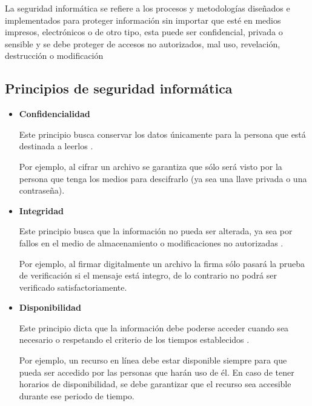 La seguridad inform\'{a}tica se refiere a los procesos y metodolog\'{i}as dise\~{n}ados e implementados para proteger informaci\'{o}n sin importar que est\'{e} en medios impresos, electr\'{o}nicos o de otro tipo, esta puede ser confidencial, privada o sensible y se debe proteger de accesos no autorizados, mal uso, revelaci\'{o}n, destrucci\'{o}n o modificaci\'{o}n \cite{_sans:_????}

  \subsection {Principios de seguridad inform\'{a}tica}

\begin{itemize}

  \item \textbf{Confidencialidad}

Este principio busca conservar los datos \'{u}nicamente para la persona que est\'{a} destinada a leerlos \cite{_nist_????}\cite{_information_????}.

Por ejemplo, al cifrar un archivo se garantiza que s\'{o}lo ser\'{a} visto por la persona que tenga los medios para descifrarlo (ya sea una llave privada o una contrase\~{n}a).

  \item \textbf{Integridad}

Este principio busca que la informaci\'{o}n no pueda ser alterada, ya sea por fallos en el medio de almacenamiento o modificaciones no autorizadas \cite{_nist_????}\cite{_information_????}.

Por ejemplo, al firmar digitalmente un archivo la firma s\'{o}lo pasar\'{a} la prueba de verificaci\'{o}n si el mensaje est\'{a} integro, de lo contrario no podr\'{a} ser verificado satisfactoriamente.

\newpage
  \item \textbf{Disponibilidad}

Este principio dicta que la informaci\'{o}n debe poderse acceder cuando sea necesario o respetando el criterio de los tiempos establecidos \cite{_nist_????}\cite{_information_????}.

Por ejemplo, un recurso en l\'{i}nea debe estar disponible siempre para que pueda ser accedido por las personas que har\'{a}n uso de \'{e}l. En caso de tener horarios de disponibilidad, se debe garantizar que el recurso sea accesible durante ese periodo de tiempo.

\end{itemize}

